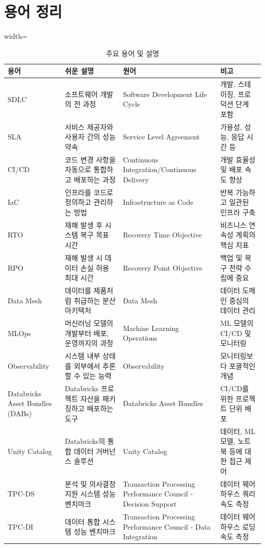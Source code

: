 \documentclass[11pt,a4paper]{article}
\begin{document}
\section*{용어 정리}
\begin{table}[h!]
\centering
\caption{주요 용어 및 설명}
\label{tab:glossary}
\begin{adjustbox}{width=\textwidth}
\begin{tabular}{llll}
\toprule
\textbf{용어} & \textbf{쉬운 설명} & \textbf{원어} & \textbf{비고} \\
\midrule
SDLC & 소프트웨어 개발의 전 과정 & Software Development Life Cycle & 개발, 스테이징, 프로덕션 단계 포함 \\
SLA & 서비스 제공자와 사용자 간의 성능 약속 & Service Level Agreement & 가용성, 성능, 응답 시간 등 \\
CI/CD & 코드 변경 사항을 자동으로 통합하고 배포하는 과정 & Continuous Integration/Continuous Delivery & 개발 효율성 및 배포 속도 향상 \\
IaC & 인프라를 코드로 정의하고 관리하는 방법 & Infrastructure as Code & 반복 가능하고 일관된 인프라 구축 \\
RTO & 재해 발생 후 시스템 복구 목표 시간 & Recovery Time Objective & 비즈니스 연속성 계획의 핵심 지표 \\
RPO & 재해 발생 시 데이터 손실 허용 최대 시간 & Recovery Point Objective & 백업 및 복구 전략 수립에 중요 \\
Data Mesh & 데이터를 제품처럼 취급하는 분산 아키텍처 & Data Mesh & 데이터 도메인 중심의 데이터 관리 \\
MLOps & 머신러닝 모델의 개발부터 배포, 운영까지의 과정 & Machine Learning Operations & ML 모델의 CI/CD 및 모니터링 \\
Observability & 시스템 내부 상태를 외부에서 추론할 수 있는 능력 & Observability & 모니터링보다 포괄적인 개념 \\
Databricks Asset Bundles (DABs) & Databricks 프로젝트 자산을 패키징하고 배포하는 도구 & Databricks Asset Bundles & CI/CD를 위한 프로젝트 단위 배포 \\
Unity Catalog & Databricks의 통합 데이터 거버넌스 솔루션 & Unity Catalog & 데이터, ML 모델, 노트북 등에 대한 접근 제어 \\
TPC-DS & 분석 및 의사결정 지원 시스템 성능 벤치마크 & Transaction Processing Performance Council - Decision Support & 데이터 웨어하우스 쿼리 속도 측정 \\
TPC-DI & 데이터 통합 시스템 성능 벤치마크 & Transaction Processing Performance Council - Data Integration & 데이터 웨어하우스 로딩 속도 측정 \\

\end{tabular}
\end{adjustbox}
\end{table}
\end{document}
